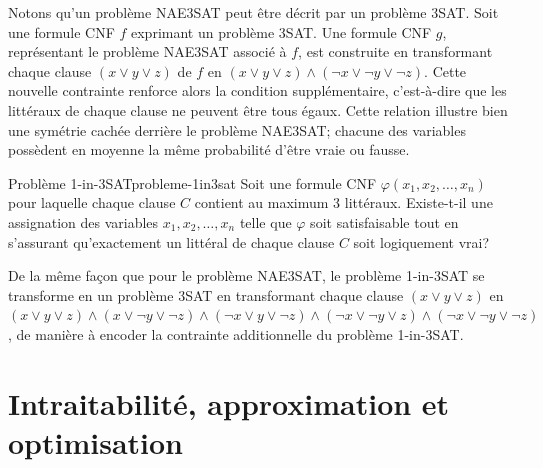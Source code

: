 Notons qu'un problème NAE3SAT peut être décrit par un problème 3SAT. Soit une formule CNF $f$ exprimant un problème 3SAT. Une formule CNF $g$, représentant le problème NAE3SAT associé à $f$, est construite en transformant chaque clause $(x \lor y \lor z)$ de $f$ en $(x \lor y \lor z) \land (\neg x \lor \neg y \lor \neg z)$. Cette nouvelle contrainte renforce alors la condition supplémentaire, c'est-à-dire que les littéraux de chaque clause ne peuvent être tous égaux. Cette relation illustre bien une symétrie cachée derrière le problème NAE3SAT; chacune des variables possèdent en moyenne la même probabilité d'être vraie ou fausse.

\begin{maindefinition}{Problème 1-in-3SAT}{probleme-1in3sat}
    Soit une formule CNF $\varphi(x_{1}, x_{2}, \dots, x_{n})$ pour laquelle chaque clause $C$ contient au maximum 3 littéraux. Existe-t-il une assignation des variables $x_{1}, x_{2}, \dots, x_{n}$ telle que $\varphi$ soit satisfaisable tout en s'assurant qu'exactement un littéral de chaque clause $C$ soit logiquement vrai?
\end{maindefinition}

De la même façon que pour le problème NAE3SAT, le problème 1-in-3SAT se transforme en un problème 3SAT en transformant chaque clause $(x \lor y \lor z)$ en $(x \lor y \lor z) \land (x \lor \neg y \lor \neg z) \land (\neg x \lor y \lor \neg z) \land (\neg x \lor \neg y \lor z) \land (\neg x \lor \neg y \lor \neg z)$, de manière à encoder la contrainte additionnelle du problème 1-in-3SAT.



\section{Intraitabilité, approximation et optimisation}
\label{sec:intractabilite-approximation-et-optimisation}

